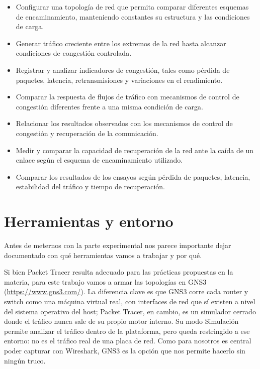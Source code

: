 \documentclass[11pt,a4paper]{article}
\begin{document}
\begin{itemize}[leftmargin=1.2cm]
  \item Configurar una topolog\'ia de red que permita comparar diferentes esquemas de encaminamiento, manteniendo constantes su estructura y las condiciones de carga.
  \item Generar tr\'afico creciente entre los extremos de la red hasta alcanzar condiciones de congesti\'on controlada.
  \item Registrar y analizar indicadores de congesti\'on, tales como p\'erdida de paquetes, latencia, retransmisiones y variaciones en el rendimiento.
  \item Comparar la respuesta de flujos de tr\'afico con mecanismos de control de congesti\'on diferentes frente a una misma condici\'on de carga.
  \item Relacionar los resultados observados con los mecanismos de control de congesti\'on y recuperaci\'on de la comunicaci\'on.
  \item Medir y comparar la capacidad de recuperaci\'on de la red ante la ca\'ida de un enlace seg\'un el esquema de encaminamiento utilizado.
  \item Comparar los resultados de los ensayos seg\'un p\'erdida de paquetes, latencia, estabilidad del tr\'afico y tiempo de recuperaci\'on.
\end{itemize}

\clearpage
\section{Herramientas y entorno}
\label{sec:herramientas}

Antes de meternos con la parte experimental nos parece importante dejar documentado con qu\'e herramientas vamos a trabajar y por qu\'e.

Si bien Packet Tracer resulta adecuado para las pr\'acticas propuestas en la materia, para este trabajo vamos a armar las topolog\'ias en GNS3 (\url{https://www.gns3.com/}). La diferencia clave es que GNS3 corre cada router y switch como una m\'aquina virtual real, con interfaces de red que s\'i existen a nivel del sistema operativo del host; Packet Tracer, en cambio, es un simulador cerrado donde el tr\'afico nunca sale de su propio motor interno. Su modo Simulaci\'on permite analizar el tr\'afico dentro de la plataforma, pero queda restringido a ese entorno: no es el tr\'afico real de una placa de red. Como para nosotros es central poder capturar con Wireshark, GNS3 es la opci\'on que nos permite hacerlo sin ning\'un truco.
\end{document}
